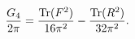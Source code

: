 \begin{equation}
\frac{G_4}{2\pi}=\frac{\textup{Tr}(F^2)}{16\pi^2}-\frac{\textup{Tr}(R^2)}{32\pi^2}. \label{cons}
\end{equation}

